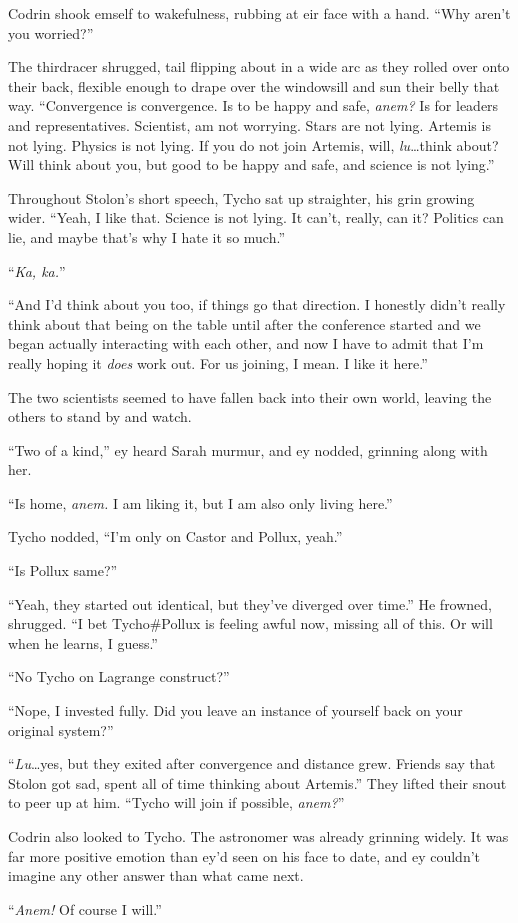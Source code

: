 Codrin shook emself to wakefulness, rubbing at eir face with a hand. ``Why aren't you worried?''

The thirdracer shrugged, tail flipping about in a wide arc as they rolled over onto their back, flexible enough to drape over the windowsill and sun their belly that way. ``Convergence is convergence. Is to be happy and safe, \emph{anem?} Is for leaders and representatives. Scientist, am not worrying. Stars are not lying. Artemis is not lying. Physics is not lying. If you do not join Artemis, will, \emph{lu}\ldots think about? Will think about you, but good to be happy and safe, and science is not lying.''

Throughout Stolon's short speech, Tycho sat up straighter, his grin growing wider. ``Yeah, I like that. Science is not lying. It can't, really, can it? Politics can lie, and maybe that's why I hate it so much.''

``\emph{Ka, ka.}''

``And I'd think about you too, if things go that direction. I honestly didn't really think about that being on the table until after the conference started and we began actually interacting with each other, and now I have to admit that I'm really hoping it \emph{does} work out. For us joining, I mean. I like it here.''

The two scientists seemed to have fallen back into their own world, leaving the others to stand by and watch.

``Two of a kind,'' ey heard Sarah murmur, and ey nodded, grinning along with her.

``Is home, \emph{anem.} I am liking it, but I am also only living here.''

Tycho nodded, ``I'm only on Castor and Pollux, yeah.''

``Is Pollux same?''

``Yeah, they started out identical, but they've diverged over time.'' He frowned, shrugged. ``I bet Tycho\#Pollux is feeling awful now, missing all of this. Or will when he learns, I guess.''

``No Tycho on Lagrange construct?''

``Nope, I invested fully. Did you leave an instance of yourself back on your original system?''

``\emph{Lu}\ldots yes, but they exited after convergence and distance grew. Friends say that Stolon got sad, spent all of time thinking about Artemis.'' They lifted their snout to peer up at him. ``Tycho will join if possible, \emph{anem?}''

Codrin also looked to Tycho. The astronomer was already grinning widely. It was far more positive emotion than ey'd seen on his face to date, and ey couldn't imagine any other answer than what came next.

``\emph{Anem!} Of course I will.''
